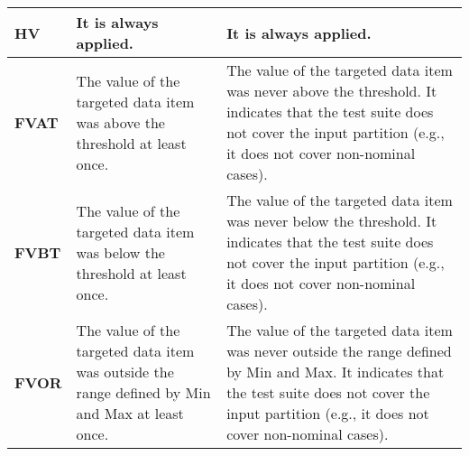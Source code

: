 \begin{table}[]
\begin{tabular}{|p{2cm}|p{6cm}|p{6cm}|}
\textbf{HV} & It is always applied.& It is always applied.\\ \hline
\textbf{FVAT} & The value of the targeted data item was above the threshold at least once. & 
The value of the targeted data item was never above the threshold. It indicates that the test suite does not cover the input partition (e.g., it does not cover non-nominal cases).\\ \hline
\textbf{FVBT} & The value of the targeted data item was below the threshold at least once. & The value of the targeted data item was never below the threshold. It indicates that the test suite does not cover the input partition (e.g., it does not cover non-nominal cases).\\ \hline
\textbf{FVOR} & The value of the targeted data item was outside the range defined by Min and Max at least once. & The value of the targeted data item was never outside the range defined by Min and Max. It indicates that the test suite does not cover the input partition (e.g., it does not cover non-nominal cases). \\ \hline
\end{tabular}
\end{table}
